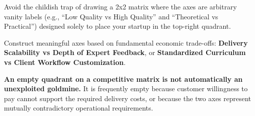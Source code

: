 Avoid the childish trap of drawing a 2x2 matrix where the axes are arbitrary vanity labels (e.g., ``Low Quality vs High Quality'' and ``Theoretical vs Practical'') designed solely to place your startup in the top-right quadrant.

Construct meaningful axes based on fundamental economic trade-offs: \textbf{Delivery Scalability vs Depth of Expert Feedback}, or \textbf{Standardized Curriculum vs Client Workflow Customization}.

\textbf{An empty quadrant on a competitive matrix is not automatically an unexploited goldmine.} It is frequently empty because customer willingness to pay cannot support the required delivery costs, or because the two axes represent mutually contradictory operational requirements.
